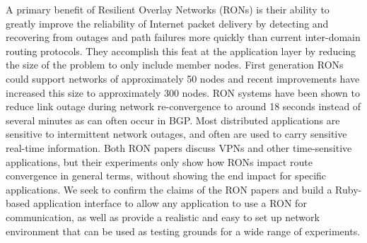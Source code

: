A primary benefit of Resilient Overlay Networks (RONs) is their ability to
greatly improve the reliability of Internet packet delivery by detecting
and recovering from outages and path failures more quickly than current
inter-domain routing protocols.  They accomplish this feat at the
application layer by reducing the size of the problem to only include
member nodes.  First generation RONs could support networks of
approximately 50 nodes and recent improvements have increased this size to
approximately 300 nodes.  RON systems have been shown to reduce link outage
during network re-convergence to around 18 seconds instead of several
minutes as can often occur in BGP. Most distributed applications are
sensitive to intermittent network outages, and often are used to carry
sensitive real-time information. Both RON papers discuss VPNs and other
time-sensitive applications, but their experiments only show how RONs
impact route convergence in general terms, without showing the end impact
for specific applications. We seek to confirm the claims of the RON papers
and build a Ruby-based application interface to allow any application to
use a RON for communication, as well as provide a realistic and easy to set
up network environment that can be used as testing grounds for a wide range
of experiments.



